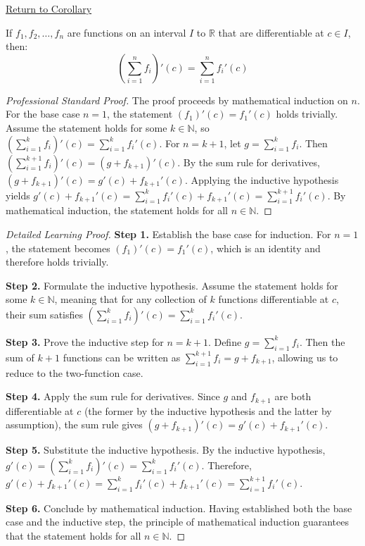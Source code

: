 \newpage
{}
\label{prf:finite-sum-rule}

\begin{remark*}[Return]
\hyperref[cor:finite-sum-rule]{Return to Corollary}
\end{remark*}

\begin{corollary*}
If $f_1, f_2, \dots, f_n$ are functions on an interval $I$ to $\mathbb{R}$ that are differentiable at $c \in I$, then:
\[ \left( \sum_{i=1}^{n} f_i \right)'(c) = \sum_{i=1}^{n} f_i'(c) \]
\end{corollary*}

\begin{proof}[Professional Standard Proof]
\LRAProofBodyStart
The proof proceeds by mathematical induction on $n$. For the base case $n=1$, the statement $(f_1)'(c) = f_1'(c)$ holds trivially. Assume the statement holds for some $k \in \mathbb{N}$, so $\left( \sum_{i=1}^{k} f_i \right)'(c) = \sum_{i=1}^{k} f_i'(c)$. For $n = k+1$, let $g = \sum_{i=1}^{k} f_i$. Then $\left( \sum_{i=1}^{k+1} f_i \right)'(c) = (g + f_{k+1})'(c)$. By the sum rule for derivatives, $(g + f_{k+1})'(c) = g'(c) + f_{k+1}'(c)$. Applying the inductive hypothesis yields $g'(c) + f_{k+1}'(c) = \sum_{i=1}^{k} f_i'(c) + f_{k+1}'(c) = \sum_{i=1}^{k+1} f_i'(c)$. By mathematical induction, the statement holds for all $n \in \mathbb{N}$.
\end{proof}

\begin{proof}[Detailed Learning Proof]
\LRAProofBodyStart

\textbf{Step 1.} Establish the base case for induction. For $n=1$, the statement becomes $(f_1)'(c) = f_1'(c)$, which is an identity and therefore holds trivially.

\textbf{Step 2.} Formulate the inductive hypothesis. Assume the statement holds for some $k \in \mathbb{N}$, meaning that for any collection of $k$ functions differentiable at $c$, their sum satisfies $\left( \sum_{i=1}^{k} f_i \right)'(c) = \sum_{i=1}^{k} f_i'(c)$.

\textbf{Step 3.} Prove the inductive step for $n = k+1$. Define $g = \sum_{i=1}^{k} f_i$. Then the sum of $k+1$ functions can be written as $\sum_{i=1}^{k+1} f_i = g + f_{k+1}$, allowing us to reduce to the two-function case.

\textbf{Step 4.} Apply the sum rule for derivatives. Since $g$ and $f_{k+1}$ are both differentiable at $c$ (the former by the inductive hypothesis and the latter by assumption), the sum rule gives $(g + f_{k+1})'(c) = g'(c) + f_{k+1}'(c)$.

\textbf{Step 5.} Substitute the inductive hypothesis. By the inductive hypothesis, $g'(c) = \left( \sum_{i=1}^{k} f_i \right)'(c) = \sum_{i=1}^{k} f_i'(c)$. Therefore, $g'(c) + f_{k+1}'(c) = \sum_{i=1}^{k} f_i'(c) + f_{k+1}'(c) = \sum_{i=1}^{k+1} f_i'(c)$.

\textbf{Step 6.} Conclude by mathematical induction. Having established both the base case and the inductive step, the principle of mathematical induction guarantees that the statement holds for all $n \in \mathbb{N}$.
\end{proof}

